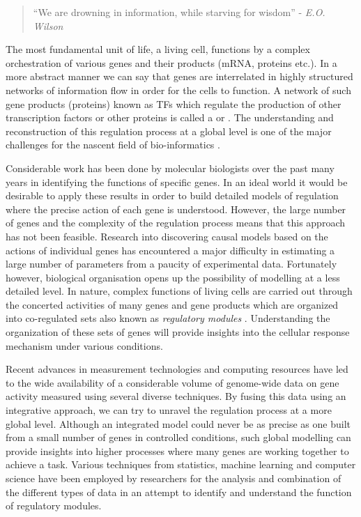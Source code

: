 \begin{quote} ``We are drowning in information, while starving for wisdom'' - \textit{E.O. Wilson} \end{quote}

The most fundamental unit of life, a living cell, functions by a complex orchestration of various genes and their products (\acs{mRNA}, proteins etc.). In a more abstract manner we can say that genes are interrelated in highly structured networks of information flow in order for the cells to function. A network of such gene products (proteins) known as \acp{TF} which regulate the production of other transcription factors or other proteins is called a  or . The understanding and reconstruction of this regulation process at a global level is one of the major challenges for the nascent field of bio-informatics \citep{kernel_methodsvert2004}. 

Considerable work has been done by molecular biologists over the past many years in identifying the functions of specific genes. In an ideal world it would be desirable to apply these results in order to build detailed models of regulation where the precise action of each gene is understood. However, the large number of genes and the complexity of the regulation process means that this approach has not been feasible. Research into discovering causal models based on the actions of individual genes has encountered a major difficulty in estimating a large number of parameters from a paucity of experimental data. Fortunately however, biological organisation opens up the possibility of modelling at a less detailed level. In nature, complex functions of living cells are carried out through the concerted activities of many genes and gene products which are organized into co-regulated sets also known as \textit{regulatory modules} \citep{segal03module}. Understanding the organization of these sets of genes will provide insights into the cellular response mechanism under various conditions. 

Recent advances in measurement technologies and computing resources have led to the wide availability of a considerable volume of genome-wide data on gene activity measured using several diverse techniques. By fusing this data using an integrative approach, we can try to unravel the regulation process at a more global level. Although an integrated model could never be as precise as one built from a small number of genes in controlled conditions, such global modelling can provide insights into higher processes where many genes are working together to achieve a task. Various techniques from statistics, machine learning and computer science have been employed by researchers for the analysis and combination of the different types of data in an attempt to identify and understand the function of regulatory modules. 

